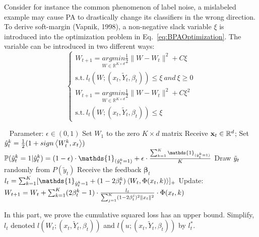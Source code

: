 Consider for instance the common phenomenon of label noise, a mislabeled example may cause PA to drastically change its classifiers in the wrong direction. To derive soft-margin (Vapnik, 1998), a non-negative slack variable $\xi$ is introduced into the optimization problem in Eq.~\ref{eq:BPAOptimization}. The variable can be introduced in two different ways:
\begin{equation}
\begin{cases}
W_{t+1} = \underset{W\in \mathbb{R}^{K\times d}}{argmin}\frac{1}{2}\parallel{W-W_t}\parallel^2 + C\xi \\ \text{s.t.}\ l_t(W;(x_t,\tilde{Y}_t,\beta_t))\leqslant \xi \ and \ \xi \geqslant 0 \\
W_{t+1} = \underset{W\in \mathbb{R}^{K\times d}}{argmin}\frac{1}{2}\parallel{W-W_t}\parallel^2 + C\xi^2 \\ \text{s.t.}\ l_t(W;(x_t,\tilde{Y}_t,\beta_t))\leqslant \xi
\end{cases}
\end{equation}



\begin{algo}
\label{algo:BPAml}
\begin{algorithmic}
\STATE	$\ \ $    
\STATE Parameter:  $\epsilon \in \left(0,1\right)$ 
\STATE Set $W_1$ to the zero $K\times d$ matrix
    \STATE	  Receive $\mathbf{x}_t \in \mathbb{R}^d$;
\STATE	Set $\hat{y}_t^k = \frac{1}{2} (1+sign\left\langle W_t^k,x_t\right\rangle)$
            \ENDFOR
         \STATE $\mathbb{P}(\tilde{y}_t^k=1|\hat{y}_t^k) = (1-\epsilon)\cdot\mathds{1}_{(\tilde{y}_t^k=1)}+ \epsilon\cdot\frac{\sumk \mathds{1}_{(\hat{y}_t^k=1)}}{K}$
      \ENDFOR
    \STATE Draw $\tilde{y}_t$ randomly from $P(\tilde{y}_t)$
    \STATE Receive the feedback $\mathbf{\beta}_t$
    \STATE $l_t = \sumk [\mathds{1}_{ \hat{y}_t^k = 1 }+(1-2\beta_t^k)\left\langle W_t,\Phi(x_t,k)\right\rangle]_{+}$
    \STATE Update: $W_{t+1} = W_t + \sum_{k=1}^{K} (2\beta_t^k-1)\cdot \frac{l_t}{\sum_{j=1}^{K}(1-2\beta_t^j)^2\parallel{x_t}\parallel^2}\cdot\Phi(x_t,k)$
    \ENDFOR
    \end{algorithmic}
\end{algo}

In this part, we prove the cumulative squared loss has an upper bound.  
Simplify, $l_t$ denoted $l\left(W_t;(x_t,\tilde{Y}_t,\beta_t)\right)$ and $l\left(u;(x_t,\tilde{Y}_t,\beta_t)\right)$ by $l_t^{\ast}$.

